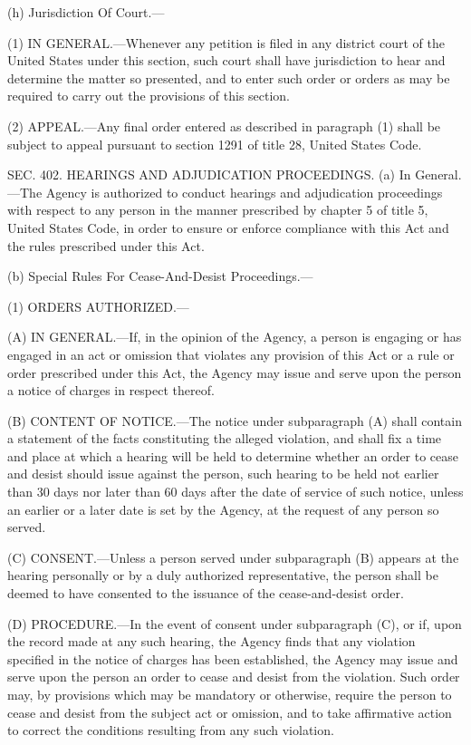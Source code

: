 (h) Jurisdiction Of Court.—

(1) IN GENERAL.—Whenever any petition is filed in any district court of the United States under this section, such court shall have jurisdiction to hear and determine the matter so presented, and to enter such order or orders as may be required to carry out the provisions of this section.

(2) APPEAL.—Any final order entered as described in paragraph (1) shall be subject to appeal pursuant to section 1291 of title 28, United States Code.


SEC. 402. HEARINGS AND ADJUDICATION PROCEEDINGS.
(a) In General.—The Agency is authorized to conduct hearings and adjudication proceedings with respect to any person in the manner prescribed by chapter 5 of title 5, United States Code, in order to ensure or enforce compliance with this Act and the rules prescribed under this Act.

(b) Special Rules For Cease-And-Desist Proceedings.—

(1) ORDERS AUTHORIZED.—

(A) IN GENERAL.—If, in the opinion of the Agency, a person is engaging or has engaged in an act or omission that violates any provision of this Act or a rule or order prescribed under this Act, the Agency may issue and serve upon the person a notice of charges in respect thereof.

(B) CONTENT OF NOTICE.—The notice under subparagraph (A) shall contain a statement of the facts constituting the alleged violation, and shall fix a time and place at which a hearing will be held to determine whether an order to cease and desist should issue against the person, such hearing to be held not earlier than 30 days nor later than 60 days after the date of service of such notice, unless an earlier or a later date is set by the Agency, at the request of any person so served.

(C) CONSENT.—Unless a person served under subparagraph (B) appears at the hearing personally or by a duly authorized representative, the person shall be deemed to have consented to the issuance of the cease-and-desist order.

(D) PROCEDURE.—In the event of consent under subparagraph (C), or if, upon the record made at any such hearing, the Agency finds that any violation specified in the notice of charges has been established, the Agency may issue and serve upon the person an order to cease and desist from the violation. Such order may, by provisions which may be mandatory or otherwise, require the person to cease and desist from the subject act or omission, and to take affirmative action to correct the conditions resulting from any such violation.

